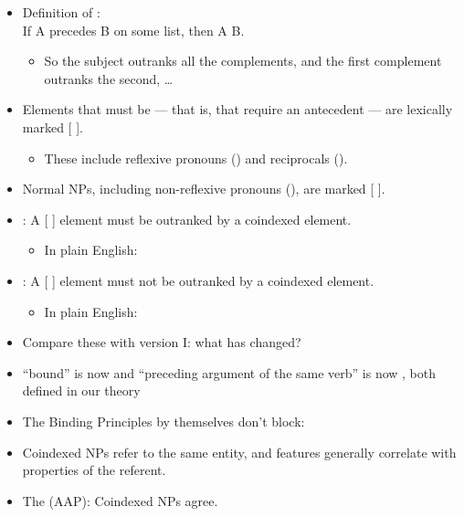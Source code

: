 \documentclass[a4paper,landscape,headrule,footrule]{foils}
\begin{document}
\begin{itemize}
\item Definition of : \\
  If A precedes B on some  list,
  then A  B.
  \begin{itemize}
  \item So the subject outranks all the complements, and the first
    complement outranks the second, \ldots
  \end{itemize}
\item Elements that must be  --- that is, that
require an antecedent --- are lexically marked
[ ]. 
\begin{itemize}
\item These include reflexive pronouns () and reciprocals ().
\end{itemize}
\item Normal  NPs, including non-reflexive pronouns
  (),  are marked [ ].
\end{itemize}

\begin{itemize}
\item {}: A [ ] element must be
outranked by a coindexed element.
\begin{itemize}
\item In plain English: 
\end{itemize}
\item {}: A [ ] element must not
be outranked by a coindexed element.
\begin{itemize}
\item In plain English: 
\end{itemize}
\item[Q] Compare these with version I: what has changed?
\item[A] ``bound'' is now  and ``preceding argument of
  the same verb'' is now , both defined in our theory
\end{itemize}

\begin{itemize}
\item The Binding Principles by themselves don’t block:
  \begin{exe}
    \ix {}
    \ix {}
    \ix {}
  \end{exe}
\item Coindexed NPs refer to the same entity, and  features
generally correlate with properties of the referent.
\item The  (AAP):
Coindexed NPs agree.
\end{itemize}
\end{document}
